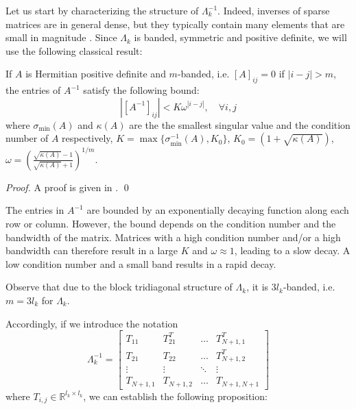 Let us start by characterizing the structure of $\Lambda_k^{-1}$. Indeed, inverses of sparse matrices are in general dense, but they typically contain many elements that are small in magnitude \cite{Benzi2002}. Since $\Lambda_k$ is banded, symmetric and positive definite, we will use the following classical result:
\begin{lemma} \label{l:decay}
If $A$ is Hermitian positive definite and $m$-banded, i.e. $[A]_{ij} = 0$ if $|i-j| > m$, the entries of $A^{-1}$ satisfy the following bound:
\begin{equation}
|[A^{-1}]_{ij}| < K\omega^{|i-j|}, \quad \forall i,j
\end{equation}
where $\sigma_{\min}(A)$ and $\kappa(A)$ are the the smallest singular value and the condition number of $A$ respectively, $K = \max \{ \sigma_{\min}^{-1}(A), K_0 \}$, $K_0 = (1 + \sqrt{\kappa(A)})$, $\omega = \left( \frac{\sqrt{\kappa(A)} - 1}{\sqrt{\kappa(A)} + 1} \right)^{1/m}$.
\end{lemma}
\begin{proof}
A proof is given in \cite{Demko1986}. \qed
\end{proof}
\begin{remark}
The entries in $A^{-1}$ are bounded by an exponentially decaying function along each row or column. However, the bound depends on the condition number and the bandwidth of the matrix. Matrices with a high condition number and/or a high bandwidth can therefore result in a large $K$ and $\omega \approx 1$, leading to a slow decay. A low condition number and a small band results in a rapid decay.
\end{remark}
\begin{remark}
Observe that due to the block tridiagonal structure of $\Lambda_k$, it is $3 l_k$-banded, i.e. $m = 3 l_k$ for $\Lambda_k$.
\end{remark}
Accordingly, if we introduce the notation
\begin{equation}
\Lambda_k^{-1} = \left[ \begin{array}{cccc}
T_{11} & T_{21}^T & \hdots & T_{N+1,1}^T \\
T_{21} & T_{22} & \hdots & T_{N+1,2}^T \\
\vdots & \vdots  & \ddots & \vdots \\
T_{N+1,1} & T_{N+1,2} & \hdots & T_{N+1,N+1}
\end{array} \right]
\end{equation}
where $T_{i,j} \in \mathbb{R}^{l_{k} \times l_{k}}$, we can establish the following proposition:


